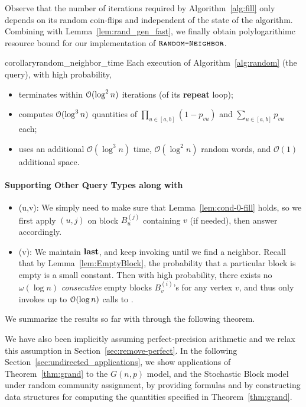 Observe that the number of iterations required by Algorithm~\ref{alg:fill} only depends on its random coin-flips and independent of the state of the algorithm.
Combining with Lemma~\ref{lem:rand_gen_fast}, we finally obtain polylogarithimc resource bound for our implementation of $\texttt{\textsc{Random-Neighbor}}$.

\begin{restatable}{corollary}{random_neighbor_time}
\label{cor:random_neighbor_time}
Each execution of Algorithm~\ref{alg:random} (the  query), with high probability,
\begin{itemize}
\item terminates within $\mathcal{O}(\log^2 n)$ iterations (of its \textup{\textbf{repeat}} loop);
\item computes $\mathcal{O}(\log^3 n)$ quantities of $\prod_{u \in [a,b]} (1-p_{vu})$ and $\sum_{u\in[a,b]} p_{vu}$ each;
\item uses an additional $\mathcal O(\log^3 n)$ time, $\mathcal O(\log^2 n)$ random words, and $\mathcal O(1)$ additional space.
\end{itemize}
\end{restatable}

\paragraph*{Supporting Other Query Types along with }
\begin{itemize}
\item {}(u,v): We simply need to make sure that Lemma~\ref{lem:cond-0-fill} holds, so we first apply $(u,j)$ on block $B_u^{(j)}$ containing $v$ (if needed), then answer accordingly.
\item {}(v): We maintain $\mathbf{last}$, and keep invoking  until we find a neighbor. Recall that by Lemma~\ref{lem:EmptyBlock}, the probability that a particular block is empty is a small constant. Then with high probability, there exists no $\omega(\log n)$ \emph{consecutive} empty blocks $B^{(i)}_v$'s for any vertex $v$, and thus  only invokes up to $\mathcal{O}(\log n)$ calls to .
\end{itemize}

We summarize the results so far with through the following theorem.

\UndirectedGrand*

We have also been implicitly assuming perfect-precision arithmetic and we relax this assumption in Section~\ref{sec:remove-perfect}.
In the following Section~\ref{sec:undirected_applications}, we show applications of Theorem~\ref{thm:grand} to the $G(n,p)$ model,
and the Stochastic Block model under random community assignment,
by providing formulas and by constructing data structures for computing the quantities specified in Theorem~\ref{thm:grand}.
